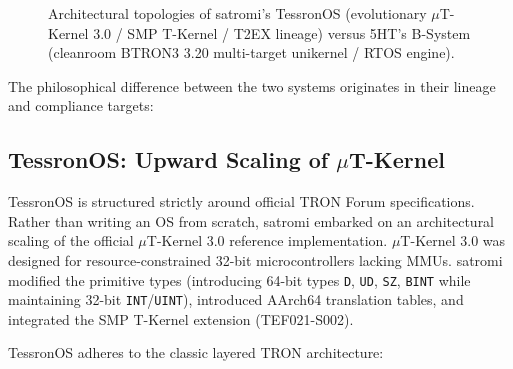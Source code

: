 \documentclass[10pt,journal,compsoc,twocolumn]{article}
\newcommand{\ja}[1]{\begin{CJK*}{UTF8}{min}#1\end{CJK*}}
\begin{document}
\begin{figure}[t]
\caption{Architectural topologies of satromi's TessronOS (evolutionary $\mu$T-Kernel 3.0 / SMP T-Kernel / T2EX lineage) versus 5HT's B-System (cleanroom BTRON3 3.20 multi-target unikernel / RTOS engine).}
\label{fig:arch_comparison}
\end{figure}

The philosophical difference between the two systems originates in their lineage and compliance targets:

\subsection{TessronOS: Upward Scaling of $\mu$T-Kernel}
TessronOS is structured strictly around official TRON Forum specifications. Rather than writing an OS from scratch, satromi embarked on an architectural scaling of the official $\mu$T-Kernel 3.0 reference implementation. $\mu$T-Kernel 3.0 was designed for resource-constrained 32-bit microcontrollers lacking MMUs. satromi modified the primitive types (introducing 64-bit types \texttt{D}, \texttt{UD}, \texttt{SZ}, \texttt{BINT} while maintaining 32-bit \texttt{INT}/\texttt{UINT}), introduced AArch64 translation tables, and integrated the SMP T-Kernel extension (TEF021-S002). 

TessronOS adheres to the classic layered TRON architecture:
\end{document}
